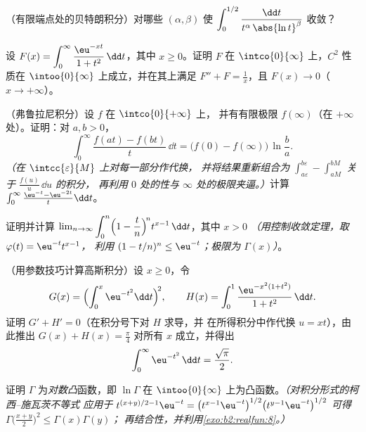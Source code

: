 \begin{exercise}[$\star\star$]\label{exo:b2:integration:4}
（有限端点处的贝特朗积分）对哪些 $(\alpha,
\beta)$ 使 $\displaystyle\int_0^{1/2}
\frac{\dd t}{t^\alpha\,\abs{\ln t}^\beta}$ 收敛？
\end{exercise}

\begin{exercise}[$\star\star$]\label{exo:b2:integration:5}
设 $F(x) = \displaystyle\int_0^{\infty} \frac{\eu^{-xt}}{1 +
t^2}\,\dd t$，其中 $x \geq 0$。证明 $F$ 在
$\intco{0}{\infty}$ 上，$C^2$ 性质在 $\intoo{0}{\infty}$ 上成立，并在其上满足 $F'' +
F = \frac1x$，且 $F(x) \to 0$（$x \to +\infty$）。
\end{exercise}

\begin{exercise}[$\star\star$]\label{exo:b2:integration:6}
（弗鲁拉尼积分）设 $f$ 在 $\intco{0}{+\infty}$ 上，
并有有限极限 $f(\infty)$（在 $+\infty$ 处）。证明：对 $a, b > 0$，
\[
\int_0^{\infty} \frac{f(at) - f(bt)}{t}\,\dd t
= \bigl(f(0) - f(\infty)\bigr)\,\ln\frac ba .
\]
\emph{（在 $\intcc{\varepsilon}{M}$ 上对每一部分作代换，
并将结果重新组合为 $\int_{a\varepsilon}^{b\varepsilon} -
\int_{aM}^{bM}$ 关于 $\frac{f(u)}u\,\dd u$ 的积分，
再利用 $0$ 处的性与 $\infty$ 处的极限夹逼。）}计算
$\int_0^\infty \frac{\eu^{-t} - \eu^{-2t}}{t}\dd t$。
\end{exercise}

\begin{exercise}[$\star\star$]\label{exo:b2:integration:7}
证明并计算 $\lim_{n\to\infty} \displaystyle\int_0^n
\Bigl(1 - \frac tn\Bigr)^{\!n} t^{x-1}\,\dd t$，其中 $x > 0$
\emph{（用控制收敛定理，取 $\varphi(t) = \eu^{-t}t^{x-1}$，
利用 $(1 - t/n)^n \leq \eu^{-t}$；极限为 $\Gamma(x)$）}。
\end{exercise}

\begin{exercise}[$\star\star\star$]\label{exo:b2:integration:8}
（用参数技巧计算高斯积分）设 $x \geq 0$，令
\[
G(x) = \Bigl(\int_0^x \eu^{-t^2}\dd t\Bigr)^{\!2},
\qquad
H(x) = \int_0^1 \frac{\eu^{-x^2(1+t^2)}}{1 + t^2}\,\dd t .
\]
证明 $G' + H' = 0$（在积分号下对 $H$ 求导，并
在所得积分中作代换 $u = xt$），由此推出 $G(x) + H(x)
= \frac\pi4$ 对所有 $x$ 成立，并得出
\[
\int_0^{\infty} \eu^{-t^2}\,\dd t = \frac{\sqrt\pi}{2} .
\]
\end{exercise}

\begin{exercise}[$\star\star\star$]\label{exo:b2:integration:9}
证明 $\Gamma$ 为\emph{对数凸}函数，即 $\ln\Gamma$ 在
$\intoo{0}{\infty}$ 上为凸函数。\emph{（对积分形式的柯西--施瓦茨不等式
应用于 $t^{(x+y)/2 - 1}\eu^{-t} = \bigl(t^{x-1}\eu^{-t}\bigr)^{1/2}
\bigl(t^{y-1}\eu^{-t}\bigr)^{1/2}$ 可得
$\Gamma\bigl(\frac{x+y}{2}\bigr)^2 \leq \Gamma(x)\Gamma(y)$；
再结合性，并利用\cref{exo:b2:realfun:8}。）}
\end{exercise}

